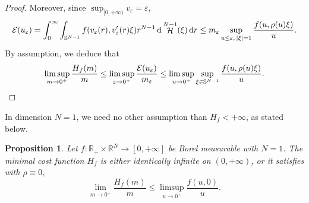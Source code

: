 \documentclass[JEP,XML,SOM,Unicode,published]{cedram}
\theoremstyle{plain}
\newtheorem{proposition}[theorem]{Proposition}
\theoremstyle{definition}
\newcommand{\dd}{\mathop{}\mathopen{}\mathrm{d}}
\newcommand{\R}{\mathbb{R}}
\newcommand{\Sph}{\mathbb{S}}
\newcommand{\ener}{\mathcal{E}}
\newcommand{\eps}{\varepsilon}
\DeclarePairedDelimiter{\abs}{\lvert}{\rvert}
\DeclareMathOperator{\hdm}{\mathcal{H}}
\begin{document}
\begin{proof}
Moreover, since \(\sup_{[0,+\infty)} v_\eps=\eps\),
\begin{align*}
\ener(u_\eps)
=\int_0^\infty\int_{\Sph^{N-1}}f(v_\eps(r),v_\eps'(r)\xi) r^{N-1}\dd \hdm^{N-1}(\xi) \dd r
\leq
m_\eps\sup_{u\leq\eps,\, \abs{\xi}=1}\frac{f(u,\rho(u)\xi)}{u}.
\end{align*}
By assumption, we deduce that
\[
\limsup_{m\to 0^+}\frac{H_f(m)}{m}\leq\limsup_{\eps\to 0^+} \frac{\ener(u_\eps)}{m_\eps}\leq\limsup_{u\to 0^+}\sup_{\xi\in\Sph^{N-1} }\frac{f(u,\rho(u)\xi)}{u}.\qedhere
\]
\end{proof}

In dimension \(N=1\), we need no other assumption than \(H_f<+\infty\), as stated below.
\begin{proposition}\label{slopeUpperBound1D}
Let $f :\R_+\times\R^N\to[0,+\infty]$ be Borel measurable with $N=1$. The minimal cost function \(H_f\) is either identically infinite on \((0,+\infty)\), or it satisfies  with $\rho \equiv 0$, \ie
\[\lim_{m\to 0^+} \frac{H_f(m)}m \leq \limsup_{u\to 0^+} \frac{f(u,0)}u.\]
\end{proposition}
\end{document}
